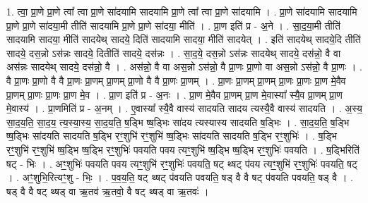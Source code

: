 \documentclass[17pt]{extarticle}
\begin{document}
1. त्वा॒ प्रा॒णे प्रा॒णे त्वा᳚ त्वा प्रा॒णे सा॑दयामि सादयामि प्रा॒णे त्वा᳚ त्वा प्रा॒णे सा॑दयामि । . प्रा॒णे सा॑दयामि सादयामि प्रा॒णे प्रा॒णे सा॑दया॒मी तीति॑ सादयामि प्रा॒णे प्रा॒णे सा॑दया॒ मीति॑ । . प्रा॒ण इति॑ प्र - अ॒ने । . सा॒द॒या॒मी तीति॑ सादयामि सादया॒ मीति॑ सादयेथ् सादये॒ दिति॑ सादयामि सादया॒ मीति॑ सादयेत् । . इति॑ सादयेथ् सादये॒दि तीति॑ सादये॒ दस॒न्नो ऽस॑न्नः सादये॒ दितीति॑ सादये॒ दस॑न्नः । . सा॒द॒ये॒ दस॒न्नो ऽस॑न्नः सादयेथ् सादये॒ दस॑न्नो॒ वै वा अस॑न्नः सादयेथ् सादये॒ दस॑न्नो॒ वै । . अस॑न्नो॒ वै वा अस॒न्नो ऽस॑न्नो॒ वै प्रा॒णः प्रा॒णो वा अस॒न्नो ऽस॑न्नो॒ वै प्रा॒णः । . वै प्रा॒णः प्रा॒णो वै वै प्रा॒णः प्रा॒णम् प्रा॒णम् प्रा॒णो वै वै प्रा॒णः प्रा॒णम् । . प्रा॒णः प्रा॒णम् प्रा॒णम् प्रा॒णः प्रा॒णः प्रा॒ण मे॒वैव प्रा॒णम् प्रा॒णः प्रा॒णः प्रा॒ण मे॒व । . प्रा॒ण इति॑ प्र - अ॒नः । . प्रा॒ण मे॒वैव प्रा॒णम् प्रा॒ण मे॒वास्या᳚ स्यै॒व प्रा॒णम् प्रा॒ण मे॒वास्य॑ । . प्रा॒णमिति॑ प्र - अ॒नम् । . ए॒वास्या᳚ स्यै॒वै वास्य॑ सादयति सादय त्यस्यै॒वै वास्य॑ सादयति । . अ॒स्य॒ सा॒द॒य॒ति॒ सा॒द॒य॒ त्य॒स्या॒स्य॒ सा॒द॒य॒ति॒ ष॒ड्भि ष्ष॒ड्भिः सा॑दय त्यस्यास्य सादयति ष॒ड्भिः । . सा॒द॒य॒ति॒ ष॒ड्भि ष्ष॒ड्भिः सा॑दयति सादयति ष॒ड्भि रꣳ॒॒शुभि॑ रꣳ॒॒शुभि॑ ष्ष॒ड्भिः सा॑दयति सादयति ष॒ड्भि रꣳ॒॒शुभिः॑ । . ष॒ड्भि रꣳ॒॒शुभि॑ रꣳ॒॒शुभि॑ ष्ष॒ड्भि ष्ष॒ड्भि रꣳ॒॒शुभिः॑ पवयति पवय त्यꣳ॒॒शुभि॑ ष्ष॒ड्भि ष्ष॒ड्भि रꣳ॒॒शुभिः॑ पवयति । . ष॒ड्भिरिति॑ षट् - भिः । . अꣳ॒॒शुभिः॑ पवयति पवय त्यꣳ॒॒शुभि॑ रꣳ॒॒शुभिः॑ पवयति॒ षट् थ्षट् प॑वय त्यꣳ॒॒शुभि॑ रꣳ॒॒शुभिः॑ पवयति॒ षट् । . अꣳ॒॒शुभि॒रित्यꣳ॒॒शु - भिः॒ । . प॒व॒य॒ति॒ षट् थ्षट् प॑वयति पवयति॒ षड् वै वै षट् प॑वयति पवयति॒ षड् वै । . षड् वै वै षट् थ्षड् वा ऋ॒तव॑ ऋ॒तवो॒ वै षट् थ्षड् वा ऋ॒तवः॑ । \newline
\end{document}
